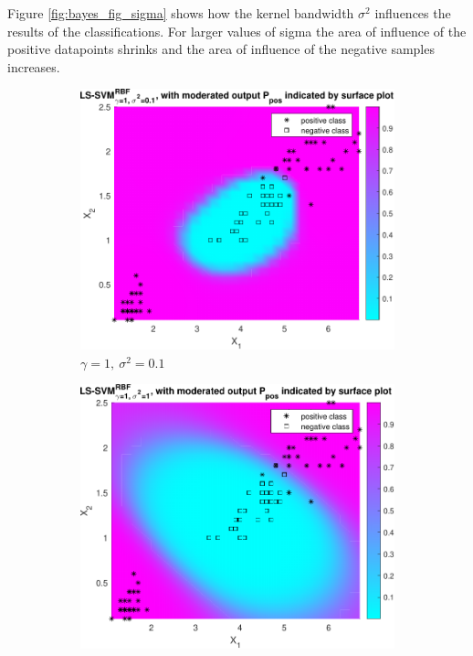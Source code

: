 \documentclass{article}
\begin{document}
            Figure \ref{fig:bayes_fig_sigma} shows how the kernel bandwidth $\sigma^2$ influences the results of the classifications. For larger values of sigma the area of influence of the positive datapoints shrinks and the area of influence of the negative samples increases. 
            
            \begin{figure}[h]
                 \centering
                 
                 \begin{subfigure}[b]{0.3\textwidth}
                     \centering
                     \includegraphics[width=\textwidth]{Assignment 1/figures/bayes_rbf_gamma_1_sig2_1.000000e-01}
                    \caption{$\gamma = 1, \ \sigma^2 = 0.1$}
                     \label{fig:bayes_1}
                 \end{subfigure}
                 \hfill
                 \begin{subfigure}[b]{0.3\textwidth}
                     \centering
                     \includegraphics[width=\textwidth]{Assignment 1/figures/bayes_rbf_gamma_1_sig2_1.pdf}

\end{subfigure}
\end{figure}
\end{document}
